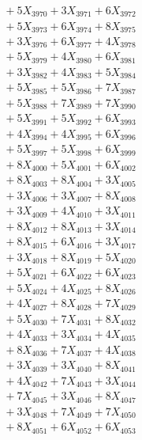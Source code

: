 \documentclass[a4paper,10pt]{article}
\begin{document}
{\begin{align}
&\;  + 5 X_{3970} + 3 X_{3971} + 6 X_{3972} \\[0.3ex]
&\;  + 5 X_{3973} + 6 X_{3974} + 8 X_{3975} \\[0.3ex]
&\;  + 3 X_{3976} + 6 X_{3977} + 4 X_{3978} \\[0.3ex]
&\;  + 5 X_{3979} + 4 X_{3980} + 6 X_{3981} \\[0.3ex]
&\;  + 3 X_{3982} + 4 X_{3983} + 5 X_{3984} \\[0.3ex]
&\;  + 5 X_{3985} + 5 X_{3986} + 7 X_{3987} \\[0.3ex]
&\;  + 5 X_{3988} + 7 X_{3989} + 7 X_{3990} \\[0.3ex]
&\;  + 5 X_{3991} + 5 X_{3992} + 6 X_{3993} \\[0.3ex]
&\;  + 4 X_{3994} + 4 X_{3995} + 6 X_{3996} \\[0.3ex]
&\;  + 5 X_{3997} + 5 X_{3998} + 6 X_{3999} \\[0.5ex]\allowbreak
&\;  + 8 X_{4000} + 5 X_{4001} + 6 X_{4002} \\[0.3ex]
&\;  + 8 X_{4003} + 8 X_{4004} + 3 X_{4005} \\[0.3ex]
&\;  + 3 X_{4006} + 3 X_{4007} + 8 X_{4008} \\[0.3ex]
&\;  + 3 X_{4009} + 4 X_{4010} + 3 X_{4011} \\[0.3ex]
&\;  + 8 X_{4012} + 8 X_{4013} + 3 X_{4014} \\[0.3ex]
&\;  + 8 X_{4015} + 6 X_{4016} + 3 X_{4017} \\[0.3ex]
&\;  + 3 X_{4018} + 8 X_{4019} + 5 X_{4020} \\[0.3ex]
&\;  + 5 X_{4021} + 6 X_{4022} + 6 X_{4023} \\[0.3ex]
&\;  + 5 X_{4024} + 4 X_{4025} + 8 X_{4026} \\[0.3ex]
&\;  + 4 X_{4027} + 8 X_{4028} + 7 X_{4029} \\[0.5ex]\allowbreak
&\;  + 5 X_{4030} + 7 X_{4031} + 8 X_{4032} \\[0.3ex]
&\;  + 4 X_{4033} + 3 X_{4034} + 4 X_{4035} \\[0.3ex]
&\;  + 8 X_{4036} + 7 X_{4037} + 4 X_{4038} \\[0.3ex]
&\;  + 3 X_{4039} + 3 X_{4040} + 8 X_{4041} \\[0.3ex]
&\;  + 4 X_{4042} + 7 X_{4043} + 3 X_{4044} \\[0.3ex]
&\;  + 7 X_{4045} + 3 X_{4046} + 8 X_{4047} \\[0.3ex]
&\;  + 3 X_{4048} + 7 X_{4049} + 7 X_{4050} \\[0.3ex]
&\;  + 8 X_{4051} + 6 X_{4052} + 6 X_{4053} \\[0.3ex]

\end{align}}
\end{document}
